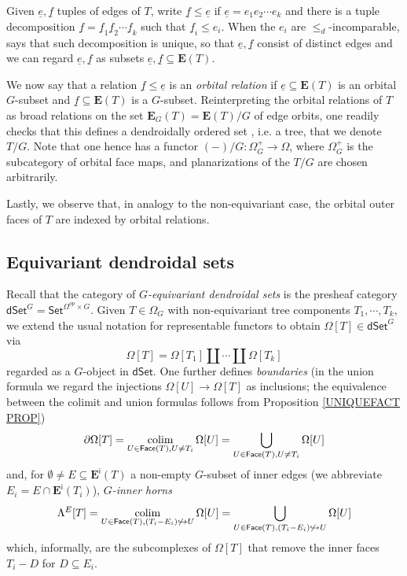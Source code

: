 \documentclass[a4paper,10pt
]{article}%
\begin{document}
\begin{remark}
Given $\underline{e},\underline{f}$ tuples of edges of $T$, 
write $\underline{f} \leq \underline{e}$
if $\underline{e} = e_1 e_2 \cdots e_k$
and there is a tuple decomposition
$\underline{f} = 
\underline{f}_1 \underline{f}_2 \cdots
\underline{f}_k$
such that $\underline{f}_i \leq e_i$.
When the $e_i$ are $\leq_d$-incomparable,
\cite[Prop. 5.30]{Per17} says that such decomposition is unique, so that $\underline{e},\underline{f}$ consist of distinct edges and we can regard 
$\underline{e},\underline{f}$ as subsets $\underline{e},\underline{f} \subseteq \boldsymbol{E}(T)$.
	
We now say that a relation
$\underline{f} \leq \underline{e}$	
is an \textit{orbital relation} if
$\underline{e} \subseteq \boldsymbol{E}(T)$
is an orbital $G$-subset and $\underline{f} \subseteq \boldsymbol{E}(T)$ is a $G$-subset. 
Reinterpreting the orbital relations of $T$ 
as broad relations on the set 
$\boldsymbol{E}_{G}(T) = \boldsymbol{E}(T)/G$ of edge orbits,
one readily checks that this defines a 
dendroidally ordered set \cite[Def. 5.9]{Per17},
i.e. a tree, that we denote $T/G$.
Note that one hence has a functor
$(-)/G \colon \Omega_G^+ \to \Omega$,
where $\Omega_G^+$ is the subcategory of orbital face maps,
and planarizations of the $T/G$ are chosen arbitrarily.

Lastly, we observe that, in analogy to the non-equivariant case,
the orbital outer faces of $T$ are indexed by orbital relations.
\end{remark}



\subsection{Equivariant dendroidal sets}\label{EQDENDSETS SEC}

Recall \cite[\S 5.4]{Per17} that the category of 
\textit{$G$-equivariant dendroidal sets}
is the presheaf category 
$\mathsf{dSet}^G = \mathsf{Set}^{\Omega^{op} \times G}$.
Given $T \in \Omega_G$ with non-equivariant tree components $T_1,\cdots,T_k$,
we extend the usual notation for representable functors 
to obtain $\Omega[T] \in \mathsf{dSet}^G$ via
\[
	\Omega[T] = \Omega[T_1] \amalg \cdots \amalg \Omega[T_k]
\]
regarded as a $G$-object in $\mathsf{dSet}$.
One further defines \textit{boundaries} (in the union formula we regard the injections $\Omega[U] \to \Omega[T]$ as inclusions; the equivalence between the colimit and union formulas follows from Proposition \ref{UNIQUEFACT PROP})
\[
	\partial \Omega[T] = 
	\mathop{\operatorname{colim}}_{U \in \mathsf{Face}(T),U \neq T_i}
	\Omega[U] =
	\bigcup_{U \in \mathsf{Face}(T),U \neq T_i}
	\Omega[U]
\]
and, for $\emptyset \neq E \subseteq \boldsymbol{E}^{\mathsf{i}}(T)$ a
non-empty $G$-subset of inner edges 
(we abbreviate $E_i = E \cap \boldsymbol{E}^{\mathsf{i}}(T_i)$), \textit{$G$-inner horns}
\[
	\Lambda^{E}[T] = 
	\mathop{\operatorname{colim}}_{U \in 
	\mathsf{Face}(T),
	(T_i - E_i) \not \hookrightarrow U}
	\Omega[U] =
	\bigcup_{U \in 
	\mathsf{Face}(T),
	(T_i - E_i) \not \hookrightarrow U}
	\Omega[U]
\]
which, informally, are the subcomplexes of $\Omega[T]$ that remove the inner faces $T_i-D$ for $D \subseteq E_i$.
\end{document}
